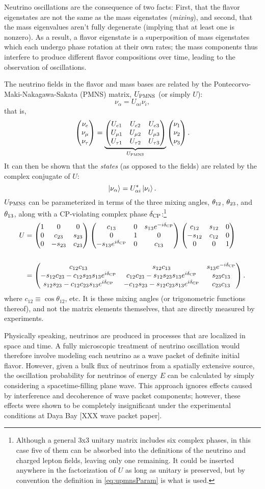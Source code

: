 \documentclass[../thesis.tex]{subfiles}
\begin{document}
Neutrino oscillations are the consequence of two facts: First, that the flavor eigenstates are not the same as the mass eigenstates (\emph{mixing}), and second, that the mass eigenvalues aren't fully degenerate (implying that at least one is nonzero). As a result, a flavor eigenstate is a superposition of mass eigenstates which each undergo phase rotation at their own rates; the mass components thus interfere to produce different flavor compositions over time, leading to the observation of oscillations.

The neutrino fields in the flavor and mass bases are related by the Pontecorvo-Maki-Nakagawa-Sakata (PMNS) matrix, $U_\mathrm{PMNS}$ (or simply $U$):
\begin{equation*}
  \nu_\alpha = U_{\alpha i} \nu_i,
\end{equation*}
that is,
\begin{equation*}
  \begin{pmatrix} \nu_e \\ \nu_\mu \\ \nu_\tau \end{pmatrix} = \underbrace{\begin{pmatrix} U_{e 1} & U_{e 2} & U_{e 3} \\ U_{\mu 1} & U_{\mu 2} & U_{\mu 3} \\ U_{\tau 1} & U_{\tau 2} & U_{\tau 3} \end{pmatrix}}_{U_\mathrm{PMNS}} \begin{pmatrix} \nu_1 \\ \nu_2 \\ \nu_3 \end{pmatrix}.
\end{equation*}
It can then be shown that the \emph{states} (as opposed to the fields) are related by the complex conjugate of $U$:
\begin{equation}
  \label{eq:nuStateRel}
  \ket{\nu_\alpha} = U^*_{\alpha i}\ket{\nu_i}.
\end{equation}
$U_\mathrm{PMNS}$ can be parameterized in terms of the three mixing angles, $\theta_{12}$, $\theta_{23}$, and $\theta_{13}$, along with a CP-violating complex phase $\delta_\text{CP}$:\footnote{Although a general 3x3 unitary matrix includes six complex phases, in this case five of them can be absorbed into the definitions of the neutrino and charged lepton fields, leaving only one remaining. It could be inserted anywhere in the factorization of $U$ as long as unitary is preserved, but by convention the definition in \eqref{eq:upmnsParam} is what is used.}
\begin{align}
  \label{eq:upmnsParam}
  \begin{split}
    U &= \begin{pmatrix} 1 & 0 & 0 \\ 0 & c_{23} & s_{23} \\ 0 & -s_{23} & c_{23} \end{pmatrix} \begin{pmatrix} c_{13} & 0 & s_{13}e^{-i\delta_\text{CP}} \\ 0 & 1 & 0 \\ -s_{13}e^{i\delta_\text{CP}} & 0 & c_{13} \end{pmatrix} \begin{pmatrix} c_{12} & s_{12} & 0 \\ -s_{12} & c_{12} & 0 \\ 0 & 0 & 1 \end{pmatrix} \\\\
    &= \begin{pmatrix} c_{12}c_{13} & s_{12} c_{13} & s_{13}e^{-i\delta_\text{CP}} \\ -s_{12}c_{23} - c_{12}s_{23}s_{13}e^{i\delta_\text{CP}} & c_{12}c_{23} - s_{12}s_{23}s_{13}e^{i\delta_\text{CP}} & s_{23}c_{13}\\s_{12}s_{23} - c_{12}c_{23}s_{13}e^{i\delta_\text{CP}} & -c_{12}s_{23} - s_{12}c_{23}s_{13}e^{i\delta_\text{CP}} & c_{23}c_{13} \end{pmatrix}.
  \end{split}
\end{align}
where \(c_{12} \equiv \cos\theta_{12}\), etc. It is these mixing angles (or trigonometric functions thereof), and not the matrix elements themselves, that are directly measured by experiments.

Physically speaking, neutrinos are produced in processes that are localized in space and time. A fully microscopic treatment of neutrino oscillation would therefore involve modeling each neutrino as a wave packet of definite initial flavor. However, given a bulk flux of neutrinos from a spatially extensive source, the oscillation probability for neutrinos of energy $E$ can be calculated by simply considering a spacetime-filling plane wave. This approach ignores effects caused by interference and decoherence of wave packet components; however, these effects were shown to be completely insignificant under the experimental conditions at Daya Bay [XXX wave packet paper].
\end{document}
